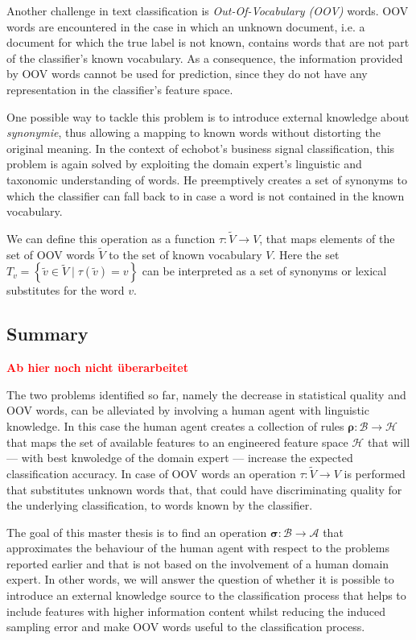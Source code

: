 Another challenge in text classification is \emph{Out-Of-Vocabulary (OOV)} 
words. OOV words are encountered in the case in which an unknown document, i.e.
a document for which the true label is not known,
contains words that are not part of the classifier's known vocabulary. 
As a consequence, the information provided by OOV words cannot be used for
prediction, since they do not have any representation in the classifier's feature 
space. 

One possible way to tackle this problem is to introduce external knowledge about
\textit{synonymie}, thus allowing a mapping to known words without distorting
the original meaning.
In the context of echobot's business signal classification, this problem is again 
solved by exploiting the domain expert's linguistic and taxonomic understanding
of words. He preemptively creates a set of synonyms to which the classifier can
fall back to in case a word is not contained in the known vocabulary.

We can define this operation as a function $\tau: \tilde{V} \to V$, that
maps elements of the set of OOV words $\tilde{V}$ to the set of known
vocabulary $V$. Here the set $T_v = \left\{ \tilde{v} \in \tilde{V} \mid
\tau(\tilde{v})=v \right\} $ can be interpreted as a set of synonyms or lexical
substitutes for the word $v$.


\subsection{Summary}

\textcolor{red}{\textbf{Ab hier noch nicht überarbeitet}}

The two problems identified so far, namely the decrease in
statistical quality and OOV words, can be alleviated by involving a human agent
with linguistic knowledge.
In this case the human agent creates a collection of rules $\boldsymbol\rho:
\mathcal{B} \to \mathcal{H}$ that maps the set of available features to an engineered
feature space $\mathcal{H}$ that will --- with best knwoledge of the domain
expert --- increase the expected classification accuracy. In case of OOV words
an operation $\tau: \tilde{V} \to V$ is performed that substitutes unknown words
that, that could have discriminating quality for the underlying classification, to words known by
the classifier. 

The goal of this master thesis is to find an operation
$\boldsymbol\sigma: \mathcal{B} \to \mathcal{A}$ that approximates the
behaviour of the human agent with respect to the problems reported earlier and
that is not based on the involvement of a human domain expert. In other words,
we will answer the question of whether it is possible to introduce an external
knowledge source to the classification process that helps to include features
with higher information content whilst reducing the induced sampling
error and make OOV words useful to the classification process.

